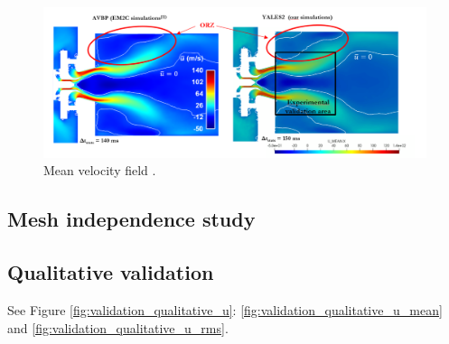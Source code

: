 \begin{figure}[h!]
	\centering
	\includegraphics[scale=0.7]{./part3_applications/figures_ch7_aero/quantitative_view_mean_velocity_field}
	\caption{Mean velocity field .}
	\label{fig:quantitative_view_mean_velocity_field}
\end{figure}

\subsection{Mesh independence study}


\subsection{Qualitative validation}


See Figure \ref{fig:validation_qualitative_u}: \ref{fig:validation_qualitative_u_mean} and \ref{fig:validation_qualitative_u_rms}.


